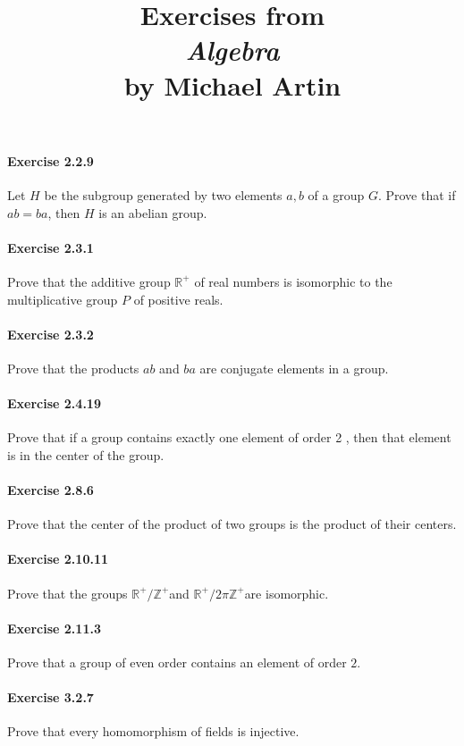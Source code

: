 \documentclass{article}
\title{\textbf{
Exercises from \\
\textit{Algebra} \\
by Michael Artin
}}
\date{}
\begin{document}
\maketitle

\paragraph{Exercise 2.2.9} Let $H$ be the subgroup generated by two elements $a, b$ of a group $G$. Prove that if $a b=b a$, then $H$ is an abelian group.

\paragraph{Exercise 2.3.1} Prove that the additive group $\mathbb{R}^{+}$ of real numbers is isomorphic to the multiplicative group $P$ of positive reals.

\paragraph{Exercise 2.3.2} Prove that the products $a b$ and $b a$ are conjugate elements in a group.

\paragraph{Exercise 2.4.19} Prove that if a group contains exactly one element of order 2 , then that element is in the center of the group.

\paragraph{Exercise 2.8.6} Prove that the center of the product of two groups is the product of their centers.

\paragraph{Exercise 2.10.11} Prove that the groups $\mathbb{R}^{+} / \mathbb{Z}^{+}$and $\mathbb{R}^{+} / 2 \pi \mathbb{Z}^{+}$are isomorphic.

\paragraph{Exercise 2.11.3} Prove that a group of even order contains an element of order $2 .$

\paragraph{Exercise 3.2.7} Prove that every homomorphism of fields is injective.
\end{document}
